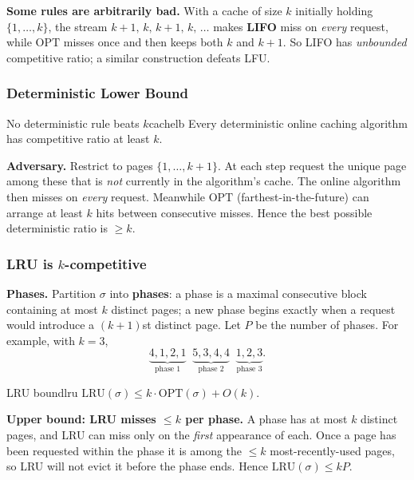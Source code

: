 \textbf{Some rules are arbitrarily bad.} With a cache of size $k$ initially holding $\{1,\dots,k\}$, the stream $k{+}1,\, k,\, k{+}1,\, k,\, \dots$ makes \textbf{LIFO} miss on \emph{every} request, while $\mathrm{OPT}$ misses once and then keeps both $k$ and $k{+}1$. So LIFO has \emph{unbounded} competitive ratio; a similar construction defeats LFU.

\subsubsection{Deterministic Lower Bound}

\begin{theorem}{No deterministic rule beats $k$}{cachelb}
Every deterministic online caching algorithm has competitive ratio at least $k$.
\end{theorem}

\textbf{Adversary.} Restrict to pages $\{1, \dots, k+1\}$. At each step request the unique page among these that is \emph{not} currently in the algorithm's cache. The online algorithm then misses on \emph{every} request. Meanwhile $\mathrm{OPT}$ (farthest-in-the-future) can arrange at least $k$ hits between consecutive misses. Hence the best possible deterministic ratio is $\ge k$.

\subsubsection{LRU is $k$-competitive}

\textbf{Phases.} Partition $\sigma$ into \textbf{phases}: a phase is a maximal consecutive block containing at most $k$ distinct pages; a new phase begins exactly when a request would introduce a $(k{+}1)$st distinct page. Let $P$ be the number of phases. For example, with $k=3$,
\[
\underbrace{4,1,2,1}_{\text{phase }1}\;\;\underbrace{5,3,4,4}_{\text{phase }2}\;\;\underbrace{1,2,3}_{\text{phase }3}.
\]

\begin{theorem}{LRU bound}{lru}
$\mathrm{LRU}(\sigma) \le k \cdot \mathrm{OPT}(\sigma) + O(k)$.
\end{theorem}

\textbf{Upper bound: LRU misses $\le k$ per phase.} A phase has at most $k$ distinct pages, and LRU can miss only on the \emph{first} appearance of each. Once a page has been requested within the phase it is among the $\le k$ most-recently-used pages, so LRU will not evict it before the phase ends. Hence $\mathrm{LRU}(\sigma) \le kP$.


